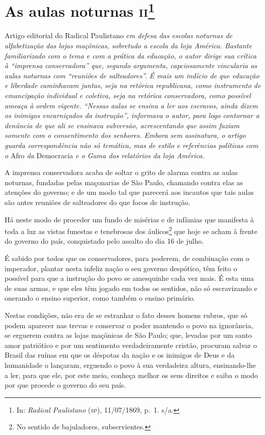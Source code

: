 \chapter{As aulas noturnas \textsc{ii}\footnote{In: \emph{Radical Paulistano}
  (\textsc{sp}), 11/07/1869, p.~1. s/a.}}

\begin{didascalia}
Artigo editorial do Radical Paulistano \emph{em defesa das escolas
noturnas de alfabetização das lojas maçônicas, sobretudo a escola da
loja América. Bastante familiarizado com o tema e com a prática da
educação, o autor dirige sua crítica à ``imprensa conservadora'' que,
segundo argumenta, capciosamente vincularia as aulas noturnas com
``reuniões de salteadores''. É mais um indício de que educação e liberdade
caminhavam juntas, seja na retórica republicana, como instrumento de
emancipação individual e coletiva, seja na retórica conservadora, como
possível ameaça à ordem vigente. ``Nessas aulas se ensina a ler aos
escravos, ainda dizem os inimigos encarniçados da instrução'', informava
o autor, para logo contornar a denúncia de que ali se ensinava
subversão, acrescentando que assim faziam somente com o consentimento
dos senhores. Embora sem assinatura, o artigo guarda correspondência não
só temática, mas de estilo e referências políticas com o} Afro \emph{da}
Democracia \emph{e o Gama dos relatórios da loja América.}
\end{didascalia}

A imprensa conservadora acaba de soltar o grito de alarma contra as
aulas noturnas, fundadas pelas maçonarias de São Paulo, chamando contra
elas as atenções do governo; e de um modo tal que parecerá aos incautos
que tais aulas são antes reuniões de salteadores do que focos de
instrução.

Há neste modo de proceder um fundo de misérias e de infâmias que
manifesta à toda a luz as vistas funestas e tenebrosas dos
áulicos\footnote{No sentido de bajuladores, subservientes.} que hoje
se acham à frente do governo do país, conquistado pelo assalto do dia 16
de julho.

É sabido por todos que os conservadores, para poderem, de combinação com
o imperador, plantar nesta infeliz nação o seu governo despótico, têm
feito o possível para que a instrução do povo se amesquinhe cada vez
mais. É esta uma de suas armas, e que eles têm jogado em todos os
sentidos, não só escravizando e onerando o ensino superior, como também
o ensino primário.

Nestas condições, não era de se estranhar o fato desses homens rubros,
que só podem aparecer nas trevas e conservar o poder mantendo o povo na
ignorância, se erguerem contra as lojas maçônicas de São Paulo; que,
levadas por um santo amor patriótico e por um sentimento verdadeiramente
cristão, procuram salvar o Brasil das ruínas em que os déspotas da nação
e os inimigos de Deus e da humanidade o lançaram, erguendo o povo à sua
verdadeira altura, ensinando-lhe a ler, para que ele, por este meio,
conheça melhor os seus direitos e saiba o modo por que procede o governo
do seu país.

